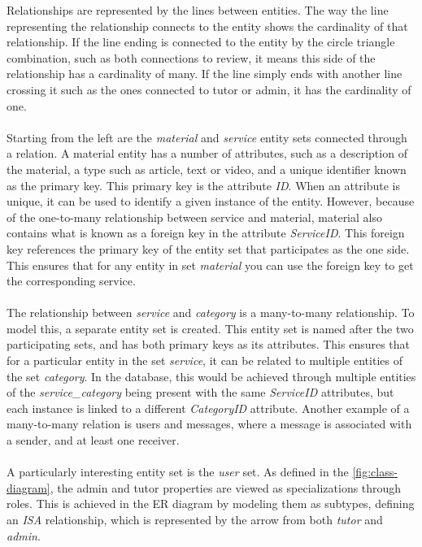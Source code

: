 Relationships are represented by the lines between entities.
The way the line representing the relationship connects to the entity shows the cardinality of that relationship.
If the line ending is connected to the entity by the circle triangle combination, such as both connections to review, it means this side of the relationship has a cardinality of many.
If the line simply ends with another line crossing it such as the ones connected to tutor or admin, it has the cardinality of one.
\\\\
Starting from the left are the \textit{material} and \textit{service} entity sets connected through a relation.
A material entity has a number of attributes, such as a description of the material, a type such as article, text or video, and a unique identifier known as the primary key.
This primary key is the attribute \textit{ID}.
When an attribute is unique, it can be used to identify a given instance of the entity.
However, because of the one-to-many relationship between service and material, material also contains what is known as a foreign key in the attribute \textit{ServiceID}.
This foreign key references the primary key of the entity set that participates as the one side.
This ensures that for any entity in set \textit{material} you can use the foreign key to get the corresponding service.
\\\\
The relationship between \textit{service} and \textit{category} is a many-to-many relationship.
To model this, a separate entity set is created.
This entity set is named after the two participating sets, and has both primary keys as its attributes.
This ensures that for a particular entity in the set \textit{service}, it can be related to multiple entities of the set \textit{category}.
In the database, this would be achieved through multiple entities of the \textit{service\_category} being present with the same \textit{ServiceID} attributes, but each instance is linked to a different \textit{CategoryID} attribute.
Another example of a many-to-many relation is users and messages, where a message is associated with a sender, and at least one receiver.
\\\\
A particularly interesting entity set is the \textit{user} set.
As defined in the \autoref{fig:class-diagram}, the admin and tutor properties are viewed as specializations through roles.
This is achieved in the ER diagram by modeling them as subtypes, defining an \textit{ISA} relationship, which is represented by the arrow from both \textit{tutor} and \textit{admin}.
